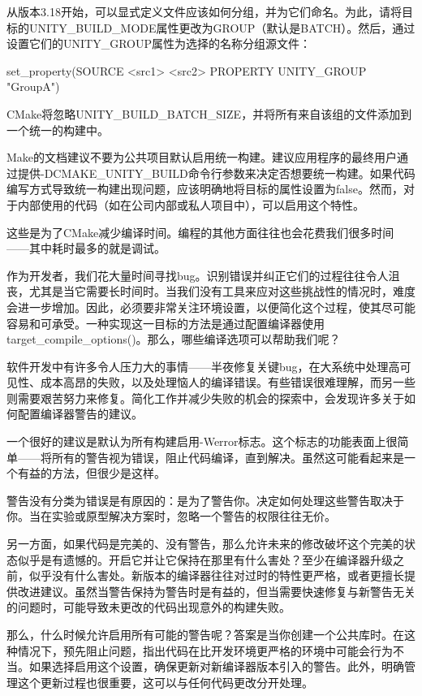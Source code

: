 从版本3.18开始，可以显式定义文件应该如何分组，并为它们命名。为此，请将目标的UNITY\_BUILD\_MODE属性更改为GROUP（默认是BATCH）。然后，通过设置它们的UNITY\_GROUP属性为选择的名称分组源文件：

\begin{shell}
set_property(SOURCE <src1> <src2> PROPERTY UNITY_GROUP "GroupA")
\end{shell}

CMake将忽略UNITY\_BUILD\_BATCH\_SIZE，并将所有来自该组的文件添加到一个统一的构建中。

Make的文档建议不要为公共项目默认启用统一构建。建议应用程序的最终用户通过提供-DCMAKE\_UNITY\_BUILD命令行参数来决定否想要统一构建。如果代码编写方式导致统一构建出现问题，应该明确地将目标的属性设置为false。然而，对于内部使用的代码（如在公司内部或私人项目中），可以启用这个特性。

这些是为了CMake减少编译时间。编程的其他方面往往也会花费我们很多时间——其中耗时最多的就是调试。


作为开发者，我们花大量时间寻找bug。识别错误并纠正它们的过程往往令人沮丧，尤其是当它需要长时间时。当我们没有工具来应对这些挑战性的情况时，难度会进一步增加。因此，必须要非常关注环境设置，以便简化这个过程，使其尽可能容易和可承受。一种实现这一目标的方法是通过配置编译器使用target\_compile\_options()。那么，哪些编译选项可以帮助我们呢？


软件开发中有许多令人压力大的事情——半夜修复关键bug，在大系统中处理高可见性、成本高昂的失败，以及处理恼人的编译错误。有些错误很难理解，而另一些则需要艰苦努力来修复。简化工作并减少失败的机会的探索中，会发现许多关于如何配置编译器警告的建议。

一个很好的建议是默认为所有构建启用-Werror标志。这个标志的功能表面上很简单——将所有的警告视为错误，阻止代码编译，直到解决。虽然这可能看起来是一个有益的方法，但很少是这样。

警告没有分类为错误是有原因的：是为了警告你。决定如何处理这些警告取决于你。当在实验或原型解决方案时，忽略一个警告的权限往往无价。

另一方面，如果代码是完美的、没有警告，那么允许未来的修改破坏这个完美的状态似乎是有遗憾的。开启它并让它保持在那里有什么害处？至少在编译器升级之前，似乎没有什么害处。新版本的编译器往往对过时的特性更严格，或者更擅长提供改进建议。虽然当警告保持为警告时是有益的，但当需要快速修复与新警告无关的问题时，可能导致未更改的代码出现意外的构建失败。

那么，什么时候允许启用所有可能的警告呢？答案是当你创建一个公共库时。在这种情况下，预先阻止问题，指出代码在比开发环境更严格的环境中可能会行为不当。如果选择启用这个设置，确保更新对新编译器版本引入的警告。此外，明确管理这个更新过程也很重要，这可以与任何代码更改分开处理。

